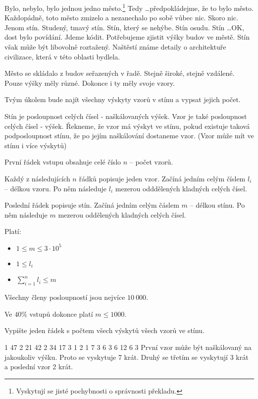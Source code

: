 





Bylo, nebylo, bylo jednou jedno město.\footnote{Vyskytují se jisté pochybnosti o správnosti překladu.}
Tedy \dots předpokládejme, že to bylo město.
Každopádně, toto město zmizelo a nezanechalo po sobě vůbec nic.
Skoro nic. Jenom stín. Studený, tmavý stín.
Stín, který se nehýbe. Stín osudu.
Stín \dots OK, dost bylo povídání.
Jdeme kódit.
Potřebujeme zjistit výšky budov ve městě.
Stín však může být libovolně roztažený.
Naštěstí známe detaily o architektuře civilizace, která v této oblasti bydlela.

Město se skládalo z budov seřazených v řadě.
Stejně široké, stejně vzdálené. Pouze výšky měly různé.
Dokonce i ty měly svoje vzory.

Tvým úkolem bude najít všechny výskyty vzorů v stínu a vypsat jejich počet.


Stín je posloupnost celých čísel - naškálovaných výšek.
Vzor je také posloupnost celých čísel - výšek.
Řekneme, že vzor má výskyt ve stínu,
pokud existuje taková podposloupnost stínu,
že po jejím naškálování dostaneme vzor.
(Vzor může mít ve stínu i více výskytů)


První řádek vstupu obsahuje celé číslo $n$
-- počet vzorů.

Každý z následujících $n$ řádků popisuje jeden vzor.
Začíná jedním celým číslem $l_i$ -- délkou vzoru.
Po něm následuje $l_i$ mezerou odddělených kladných celých čísel.

Poslední řádek popisuje stín.
Začíná jedním celým čáslem $m$ -- délkou stínu.
Po něm následuje $m$ mezerou oddělených kladných celých čísel.

\bigskip

\noindent
Platí:

\begin{itemize}
  \item $1 \leq m \leq 3\cdot10^5$
  \item $1 \leq l_i$
  \item $\sum^{n}_{i=1} l_i \leq m$
\end{itemize}
Všechny členy posloupností jsou nejvíce $10\ 000$.

\smallskip

\noindent
Ve $40\%$ vstupů dokonce platí $m \leq 1000$.


Vypište jeden řádek s počtem všech výskytů
všech vzorů ve stínu.



1 47
2 21 42
2 34 17
3 1 2 1
7 3 6 3 6 12 6 3
\sampleCOMMENT
První vzor může být naškálovaný na jakoukoliv výšku.
Proto se vyskytuje 7 krát. Druhý se třetím se
vyskytují 3 krát a poslední vzor 2 krát.
\sampleEND



